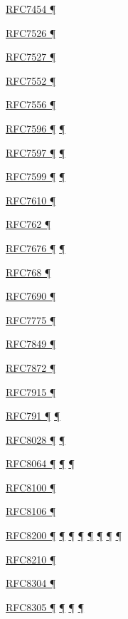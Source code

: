 \documentclass[
]{article}
\begin{document}
\hyperref[filtering]{RFC7454 ¶}

\hyperref[obsolete-techniques]{RFC7526 ¶}

\hyperref[auto-configuration]{RFC7527 ¶}

\hyperref[tunnels]{RFC7552 ¶}

\hyperref[multihoming]{RFC7556 ¶}

\hyperref[dual-stack-scenarios]{RFC7596 ¶}
\hyperref[translation-and-ipv4-as-a-service]{¶}

\hyperref[dual-stack-scenarios]{RFC7597 ¶}
\hyperref[translation-and-ipv4-as-a-service]{¶}

\hyperref[dual-stack-scenarios]{RFC7599 ¶}
\hyperref[translation-and-ipv4-as-a-service]{¶}

\hyperref[layer-2-considerations]{RFC7610 ¶}

\hyperref[why-version-6]{RFC762 ¶}

\hyperref[layer-2-functions]{RFC7676 ¶} \hyperref[tunnels]{¶}

\hyperref[transport-protocols]{RFC768 ¶}

\hyperref[extension-headers-and-options]{RFC7690 ¶}

\hyperref[routing]{RFC7775 ¶}

\hyperref[layer-2-considerations]{RFC7849 ¶}

\hyperref[extension-headers-and-options]{RFC7872 ¶}

\hyperref[translation-and-ipv4-as-a-service]{RFC7915 ¶}

\hyperref[why-version-6]{RFC791 ¶}
\hyperref[traffic-class-and-flow-label]{¶}

\hyperref[auto-configuration]{RFC8028 ¶}
\hyperref[multi-prefix-operation]{¶}

\hyperref[addresses]{RFC8064 ¶} \hyperref[auto-configuration]{¶}
\hyperref[layer-2-functions]{¶}

\hyperref[traffic-class-and-flow-label]{RFC8100 ¶}

\hyperref[auto-configuration]{RFC8106 ¶}

\hyperref[how-to-keep-up-to-date]{RFC8200 ¶}
\hyperref[ipv6-basic-technology]{¶} \hyperref[address-resolution]{¶}
\hyperref[extension-headers-and-options]{¶} \hyperref[packet-format]{¶}
\hyperref[further-reading]{¶} \hyperref[filtering]{¶}
\hyperref[markdown-usage]{¶}

\hyperref[filtering]{RFC8210 ¶}

\hyperref[transport-protocols]{RFC8304 ¶}

\hyperref[how-an-application-programmer-sees-ipv6]{RFC8305 ¶}
\hyperref[dual-stack-scenarios]{¶} \hyperref[multihoming]{¶}
\hyperref[deployment-in-the-home]{¶}
\end{document}

